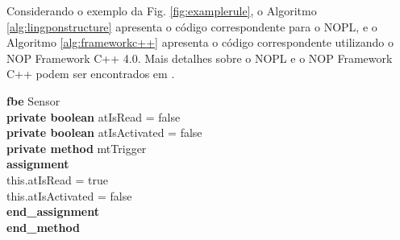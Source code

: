 Considerando o exemplo da Fig. \ref{fig:examplerule}, o Algoritmo \ref{alg:lingponstructure} apresenta o código correspondente para o NOPL, e o Algoritmo \ref{alg:frameworkc++} apresenta o código correspondente utilizando o NOP Framework C++ 4.0.
Mais detalhes sobre o NOPL e o NOP Framework C++ podem ser encontrados em \citet{ronszcka2017nopframework2,Negrini2019nopl,fabro2021nopl,Neves2021mastersframework4}.


\begin{algorithm}
\caption{Exemplo de instruções NOPL para o FBE Sensor e a \textit{Rule} rlSensorTrigger apresentados na Figura~\ref{fig:examplerule}}
\label{alg:lingponstructure}
\begin{algorithmic}[1]
\STATE \textbf{fbe} Sensor \\
\STATE \hspace{0.1cm} \textbf{private boolean} atIsRead = false \\
\STATE \hspace{0.1cm} \textbf{private boolean} atIsActivated = false \\

\STATE \hspace{0.1cm} \textbf{private method} mtTrigger \\
\STATE \hspace{0.2cm} \textbf{assignment} \\
\STATE \hspace{0.3cm} this.atIsRead = true \\
\STATE \hspace{0.3cm} this.atIsActivated = false \\
\STATE \hspace{0.2cm} \textbf{end\_assignment} \\
\STATE \hspace{0.1cm} \textbf{end\_method} \\


\end{algorithmic}
\end{algorithm}
